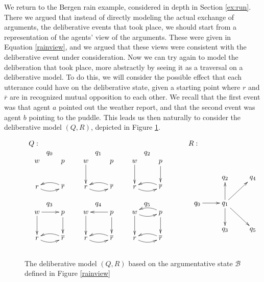 \documentclass[greybox]{svmult}
\renewcommand{\bar}[1]{\overline{#1}}
\newcommand{\views}{\mathcal B}
\begin{document}
\begin{example}
We return to the Bergen rain example, considered in depth in Section \ref{ex:run}. There we argued that instead of directly modeling the actual exchange of arguments, the deliberative events that took place, we should start from a representation of the agents' view of the arguments. These were given in Equation \ref{rainview}, and we argued that these views were consistent with the deliberative event under consideration. Now we can try again to model the deliberation that took place, more abstractly by seeing it as a traversal on a deliberative model. To do this, we will consider the possible effect that each utterance could have on the deliberative state, given a starting point where $r$ and $\overline r$ are in recognized mutual opposition to each other. We recall that the first event was that agent $a$ pointed out the weather report, and that the second event was agent $b$ pointing to the puddle. This leads us then naturally to consider the deliberative model $(Q,R)$, depicted in Figure \ref{rain}.
\begin{figure}
$\begin{array}{lll}
Q: & \hspace{0.3cm} & R: \\ 
\begin{array}{ccccccccc}
q_0 && q_1 && q_2 \\ 
\xymatrix{ w & p \\ r \ar@/_/[r] & \bar r \ar@/_/[l] } &&  \xymatrix{ w \ar[d] & p \\ r \ar@/_/[r] & \bar r \ar@/_/[l] } && \xymatrix{ w \ar[d] & p \ar[d] \\ r \ar@/_/[r] & \bar r \ar@/_/[l] } \\ \\
q_3 && q_4 && q_5 \\
\xymatrix{ w \ar[d] \ar[r] & p \ar[d] \\ r \ar@/_/[r] & \bar r \ar@/_/[l] } && \xymatrix{ w \ar[d] & p \ar[d] \ar[l] \\ r \ar@/_/[r] & \bar r \ar@/_/[l] } && \xymatrix{ w \ar@/_/[r] \ar[d]  & p \ar[d] \ar@/_/[l] \\ r \ar@/_/[r] & \bar r \ar@/_/[l] } \\ \\
\end{array} &\hspace{0.3cm} & 
\begin{array}{l} \\
\xymatrix{ & q_2 & q_4 \\
q_0 \ar[r] & q_1 \ar[ur] \ar[u] \ar[d] \ar[dr] \\ & q_3 & q_5 }
\end{array}
\end{array}$
\caption{The deliberative model $(Q,R)$ based on the argumentative state $\views$ defined in Figure \ref{rainview}}
\label{rain}
\end{figure}


\end{example}
\end{document}
